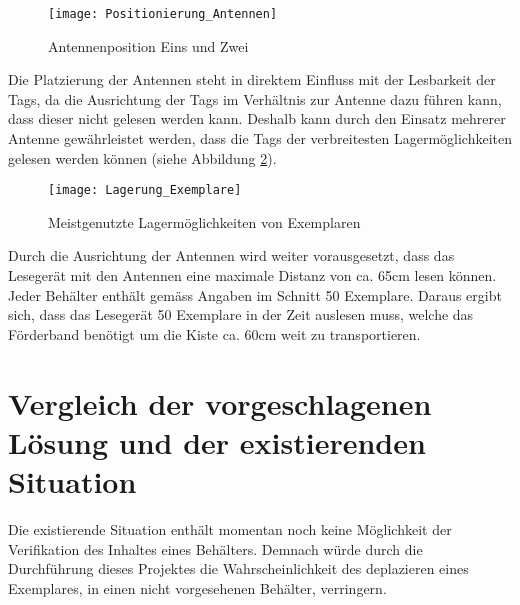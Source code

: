 \begin{figure}[htb]
	\centering
	\texttt{[image: Positionierung\_Antennen]}
	\caption{Antennenposition Eins und Zwei}
	\label{fig:positionAntennen}
\end{figure}

Die Platzierung der Antennen steht in direktem Einfluss mit der Lesbarkeit der Tags, da die Ausrichtung der Tags im Verhältnis zur Antenne dazu führen kann, dass dieser nicht gelesen werden kann. Deshalb kann durch den Einsatz mehrerer Antenne gewährleistet werden, dass die Tags der verbreitesten Lagermöglichkeiten gelesen werden können (siehe Abbildung \ref{fig:lagermöglichkeitExemplare}).

\begin{figure}[htb]
	\centering
	\texttt{[image: Lagerung\_Exemplare]}
	\caption{Meistgenutzte Lagermöglichkeiten von Exemplaren}
	\label{fig:lagermöglichkeitExemplare}
\end{figure}

Durch die Ausrichtung der Antennen wird weiter vorausgesetzt, dass das Lesegerät mit den Antennen eine maximale Distanz von ca. 65cm lesen können. Jeder Behälter enthält gemäss Angaben im Schnitt 50 Exemplare. Daraus ergibt sich, dass das Lesegerät 50 Exemplare in der Zeit auslesen muss, welche das Förderband benötigt um die Kiste ca. 60cm weit zu transportieren.

\section{Vergleich der vorgeschlagenen Lösung und der existierenden Situation}
Die existierende Situation enthält momentan noch keine Möglichkeit der Verifikation des Inhaltes eines Behälters. Demnach würde durch die Durchführung dieses Projektes die Wahrscheinlichkeit des deplazieren eines Exemplares, in einen nicht vorgesehenen Behälter, verringern.

